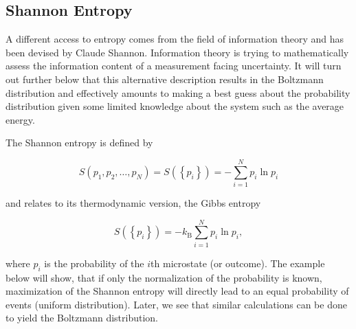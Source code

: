 \documentclass[letterpaper,10pt,english]{sphinxmanual}
\begin{document}
\noindent{}


\subsection{Shannon Entropy}
\label{\detokenize{notebooks/L2/3_Statistical_Physics_Definitions:Shannon-Entropy}}
\sphinxAtStartPar
A different access to entropy comes from the field of information theory and has been devised by Claude Shannon. Information theory is trying to mathematically assess the information content of a measurement facing uncertainty. It will turn out further below that this alternative description results in the Boltzmann distribution and effectively amounts to making a best guess about the probability distribution given some limited knowledge about the system such as the average energy.

\sphinxAtStartPar
The Shannon entropy is defined by

\sphinxAtStartPar
\begin{equation}
S\left(p_{1}, p_{2}, \ldots, p_{N}\right)=S\left(\left\{p_{i}\right\}\right)=-\sum_{i=1}^{N} p_{i} \ln p_{i}
\end{equation}

\sphinxAtStartPar
and relates to its thermodynamic version, the Gibbs entropy

\sphinxAtStartPar
\begin{equation}
S\left(\left\{p_{i}\right\}\right)=-k_\mathrm{B}\sum_{i=1}^{N} p_{i} \ln p_{i},
\end{equation}

\sphinxAtStartPar
where \(p_i\) is the probability of the \(i\)th microstate (or outcome). The example below will show, that if only the normalization of the probability is known, maximization of the Shannon entropy will directly lead to an equal probability of events (uniform distribution). Later, we see that similar calculations can be done to yield the Boltzmann distribution.
\end{document}
